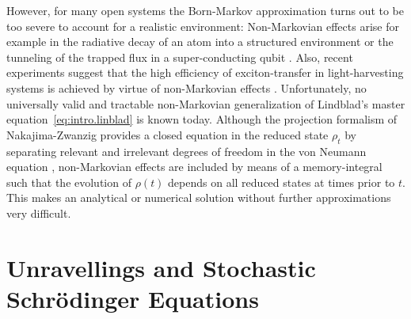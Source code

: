 
However, for many open systems the Born-Markov approximation turns out to be too severe to account for a realistic environment:
Non-Markovian effects arise for example in the radiative decay of an atom into a structured environment \cite{BrPe2002_open_quantum} or the tunneling of the trapped flux in a super-conducting qubit \cite{CaLe83_diss_system,Le87_spinboson}.
Also, recent experiments suggest that the high efficiency of exciton-transfer in light-harvesting systems is achieved by virtue of non-Markovian effects \cite{EnCaRe07_fmo}.
Unfortunately, no universally valid and tractable non-Markovian generalization of Lindblad's master equation~\ref{eq:intro.linblad} is known today.
Although the projection formalism of Nakajima-Zwanzig provides a closed equation in the reduced state $\rho_t$ by separating relevant and irrelevant degrees of freedom in the von Neumann equation \cite{BrPe2002_open_quantum}, non-Markovian effects are included by means of a memory-integral such that the evolution of $\rho(t)$ depends on all reduced states at times prior to $t$.
This makes an analytical or numerical solution without further approximations very difficult.

\section{Unravellings and Stochastic Schrödinger Equations}
\label{sec:intro.unravellings}


